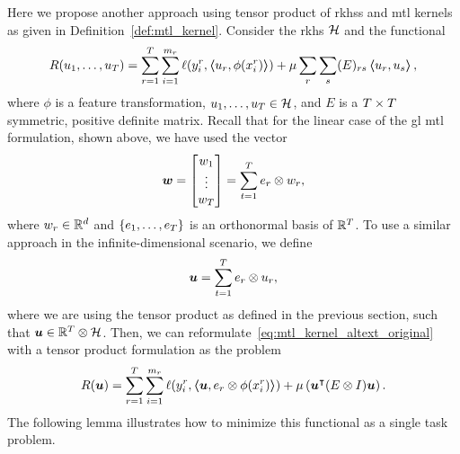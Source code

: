 Here we propose another approach using tensor product of \acrshort{rkhss} and \acrshort{mtl} kernels as given in Definition~\ref{def:mtl_kernel}. 
Consider the \acrshort{rkhs} $\mathcal{H}$ and the functional
\begin{equation}
    \label{eq:mtl_kernel_altext_original}
    \begin{aligned}
         & R({u_1, \ldots, u_T}) = \sum_{r=1}^{\ntasks} \sum_{i=1}^{\npertask_r} \lossf(y_i^r, \dotp{u_r}{\phi(x_i^r)}) + \mu \sum_r \sum_s (E)_{rs} \dotp{u_r}{u_s} , \\
    \end{aligned}
\end{equation}
where $\phi$ is a feature transformation, $u_1, \ldots, u_T \in \mathcal{H}$, and $E$ is a $T \times T$ symmetric, positive definite matrix.
%
Recall that for the linear case of the \acrshort{gl} \acrshort{mtl} formulation, shown above, we have used the vector
\begin{equation}
    \nonumber
    \bm{w} = 
    \begin{bmatrix}
        w_1 \\
        \vdots \\
        w_T 
    \end{bmatrix}
    = \sum_{t=1}^T e_r \otimes w_r ,
\end{equation}
where $w_r \in \mathbb{R}^d$ and $\left\{e_1, \ldots, e_T\right\}$ is an orthonormal basis of $\mathbb{R}^T$.
To use a similar approach in the infinite-dimensional scenario, we define
\begin{equation}
    \nonumber
    \bm{u} = \sum_{t=1}^T e_r \otimes u_r ,
\end{equation}
where we are using the tensor product as defined in the previous section, such that $\bm{u} \in \mathbb{R}^T \otimes \mathcal{H}$. Then, we can reformulate~\eqref{eq:mtl_kernel_altext_original} with a tensor product formulation as the problem
\begin{equation}
    \label{eq:mtl_kernel_altext_tensor}
    \begin{aligned}
            & R(\myvec{u}) = \sum_{r=1}^{\ntasks} \sum_{i=1}^{\npertask_r} \lossf(y_i^r, \dotp{\myvec{u}}{e_r \otimes \phi(x_i^r)}) + \mu \left(  \myvec{u}^\intercal (E \otimes I) \myvec{u} \right). \\
    \end{aligned}
\end{equation}
The following lemma illustrates how to minimize this functional as a single task problem.
